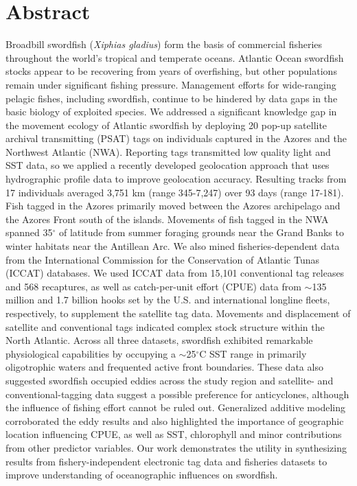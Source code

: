 \clearpage

\section{Abstract} 

Broadbill swordfish (\textit{Xiphias gladius}) form the basis of commercial fisheries throughout the world's tropical and temperate oceans. Atlantic Ocean swordfish stocks appear to be recovering from years of overfishing, but other populations remain under significant fishing pressure. Management efforts for wide-ranging pelagic fishes, including swordfish, continue to be hindered by data gaps in the basic biology of exploited species. We addressed a significant knowledge gap in the movement ecology of Atlantic swordfish by deploying 20 pop-up satellite archival transmitting (PSAT) tags on individuals captured in the Azores and the Northwest Atlantic (NWA). Reporting tags transmitted low quality light and SST data, so we applied a recently developed geolocation approach that uses hydrographic profile data to improve geolocation accuracy. Resulting tracks from 17 individuals averaged 3,751 km (range 345-7,247) over 93 days (range 17-181). Fish tagged in the Azores primarily moved between the Azores archipelago and the Azores Front south of the islands. Movements of fish tagged in the NWA spanned 35$^\circ$ of latitude from summer foraging grounds near the Grand Banks to winter habitats near the Antillean Arc. We also mined fisheries-dependent data from the International Commission for the Conservation of Atlantic Tunas (ICCAT) databases. We used ICCAT data from 15,101 conventional tag releases and 568 recaptures, as well as catch-per-unit effort (CPUE) data from $\sim$135 million and 1.7 billion hooks set by the U.S. and international longline fleets, respectively, to supplement the satellite tag data. Movements and displacement of satellite and conventional tags indicated complex stock structure within the North Atlantic. Across all three datasets, swordfish exhibited remarkable physiological capabilities by occupying a $\sim$25$^\circ$C SST range in primarily oligotrophic waters and frequented active front boundaries. These data also suggested swordfish occupied eddies across the study region and satellite- and conventional-tagging data suggest a possible preference for anticyclones, although the influence of fishing effort cannot be ruled out. Generalized additive modeling corroborated the eddy results and also highlighted the importance of geographic location influencing CPUE, as well as SST, chlorophyll and minor contributions from other predictor variables. Our work demonstrates the utility in synthesizing results from fishery-independent electronic tag data and fisheries datasets to improve understanding of oceanographic influences on swordfish.

